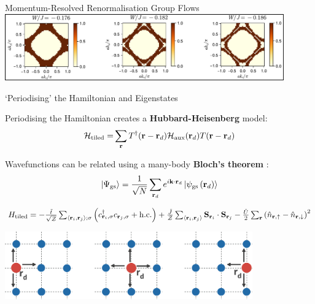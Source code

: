 \documentclass[12pt,aspectratio=169]{beamer}
\newcommand\focus[1]{%
	{\alert{\textbf{#1}}}
}
\begin{document}
\begin{frame}{Momentum-Resolved Renormalisation Group Flows}
\vspace*{\fill}
\includegraphics[width=0.9\textwidth]{scattProb.pdf}
	
\end{frame}

\begin{frame}{`Periodising' the Hamiltonian and Eigenstates}
	\begin{minipage}{0.45\textwidth}
		Periodising the Hamiltonian creates a \focus{Hubbard-Heisenberg} model:
	\begin{equation*}\begin{aligned}
		\mathcal{H}_\text{tiled} =& \sum_{{\bf r}}T^\dagger({\bf r} - {\bf r}_d)\mathcal{H}_\text{aux}({\bf r}_d)T({\bf r} - {\bf r}_d)\\
	\end{aligned}\end{equation*}
	\end{minipage}
	\hspace{\fill}
	\begin{minipage}{0.45\textwidth}
		Wavefunctions can be related using a many-body \focus{Bloch's theorem}:
	\[\ket{\Psi_\text{gs}} = \frac{1}{\sqrt N}\sum_{{\bf r}_d} e^{i {\bf k}\cdot{\bf r}_d} \ket{\psi_\text{gs}\left({\bf r}_d\right)}\]

	\end{minipage}

	\vspace*{\fill}
	\(H_\text{tiled} = -\frac{\tilde t}{\sqrt{\mathcal{Z}}}\sum_{\left<{\bf r}_i, {\bf r}_j\right>;\sigma}\left(c^\dagger_{{\bf r}_i,\sigma}c_{{\bf r}_j,\sigma} + \text{h.c.}\right) + \frac{\tilde J}{\mathcal{Z}}\sum_{\left< {\bf r}_i, {\bf r}_j\right>}{\bf S}_{{\bf r}_i}\cdot{\bf S}_{{\bf r}_j} - \frac{\tilde U}{2}\sum_{\bf r}\left(\hat n_{{\bf r} , \uparrow} - \hat n_{{\bf r} , \downarrow}\right)^2\)

	\vspace*{15pt}
	\includegraphics[width=0.8\textwidth]{periodisation.pdf}
	
\end{frame}
\end{document}
